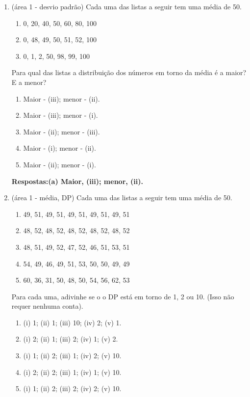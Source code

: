 \documentclass[12pt]{article}\documentclass[brazilian,12pt,a4paper,final]{article}
\begin{document}
\begin{enumerate}
\item (área 1 - desvio padrão) Cada uma das listas a seguir tem uma média de 50. 
\begin{enumerate}[label=(\roman*)]
\item 0, 20, 40, 50, 60, 80, 100

\item 0, 48, 49, 50, 51, 52, 100

\item 0, 1, 2, 50, 98, 99, 100
\end{enumerate}
    Para qual das listas a distribuição dos números em torno da média é a maior? E a menor?
\begin{enumerate}
    \item Maior - (iii); menor - (ii).
    \item Maior - (iii); menor - (i).
    \item Maior - (ii); menor - (iii).
    \item Maior - (i); menor - (ii).
    \item Maior - (ii); menor - (i).
\end{enumerate}

\textbf{Respostas:(a) Maior, (iii); menor, (ii).}

\item (área 1 - média, DP) Cada uma das listas a seguir tem uma média de 50. 
\begin{enumerate}[label=(\roman*)]
\item 49, 51, 49, 51, 49, 51, 49, 51, 49, 51

\item 48, 52, 48, 52, 48, 52, 48, 52, 48, 52

\item 48, 51, 49, 52, 47, 52, 46, 51, 53, 51

\item 54, 49, 46, 49, 51, 53, 50, 50, 49, 49

\item 60, 36, 31, 50, 48, 50, 54, 56, 62, 53
\end{enumerate}
Para cada uma, adivinhe se o
o DP está em torno de 1, 2 ou 10. (Isso não requer nenhuma conta).
\begin{enumerate}
    \item (i) 1; (ii) 1; (iii) 10; (iv) 2; (v) 1.
    \item (i) 2; (ii) 1; (iii) 2; (iv) 1; (v) 2.
    \item (i) 1; (ii) 2; (iii) 1; (iv) 2; (v) 10.
    \item (i) 2; (ii) 2; (iii) 1; (iv) 1; (v) 10.
    \item (i) 1; (ii) 2; (iii) 2; (iv) 2; (v) 10.
\end{enumerate}



\end{enumerate}
\end{document}
